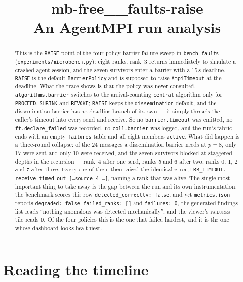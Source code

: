 \documentclass[11pt]{article}
\title{\textbf{mb-free\_\_faults-raise}\\[2pt]\large An AgentMPI run analysis}
\author{}
\date{}
\begin{document}
\maketitle

\begin{abstract}
This is the \texttt{RAISE} point of the four-policy barrier-failure sweep in
\texttt{bench\_faults} (\texttt{experiments/microbench.py}): eight ranks, rank~3 returns
immediately to simulate a crashed agent session, and the seven survivors enter a barrier
with a 15\,s deadline. \texttt{RAISE} is the default \texttt{BarrierPolicy} and is
supposed to raise \texttt{AmpiTimeout} at the deadline. What the trace shows is that the
policy was never consulted. \texttt{algorithms.barrier} switches to the arrival-counting
\texttt{central} algorithm only for \texttt{PROCEED}, \texttt{SHRINK} and \texttt{REVOKE};
\texttt{RAISE} keeps the \texttt{dissemination} default, and the dissemination barrier
has no deadline branch of its own --- it simply threads the caller's timeout into every
send and receive. So no \texttt{barrier.timeout} was emitted, no
\texttt{ft.declare\_failed} was recorded, no \texttt{coll.barrier} was logged, and the
run's fabric ends with an empty \texttt{failures} table and all eight members
\texttt{active}. What did happen is a three-round collapse: of the 24 messages a
dissemination barrier needs at $p=8$, only 17 were sent and only 10 were received, and
the seven survivors blocked at staggered depths in the recursion --- rank~4 after one
send, ranks 5 and 6 after two, ranks 0, 1, 2 and 7 after three. Every one of them then
raised the identical error, \texttt{ERR\_TIMEOUT: receive timed out [\ldots source=4
\ldots]}, naming a rank that was alive. The single most important thing to take away is
the gap between the run and its own instrumentation: the benchmark scores this row
\texttt{detected\_correctly:\ false}, and yet \texttt{metrics.json} reports
\texttt{degraded:\ false}, \texttt{failed\_ranks:\ []} and \texttt{failures:\ 0}, the
generated findings list reads ``nothing anomalous was detected mechanically'', and the
viewer's \textsc{failures} tile reads \textbf{0}. Of the four policies this is the one
that failed hardest, and it is the one whose dashboard looks healthiest.
\end{abstract}



\section{Reading the timeline}
\end{document}

